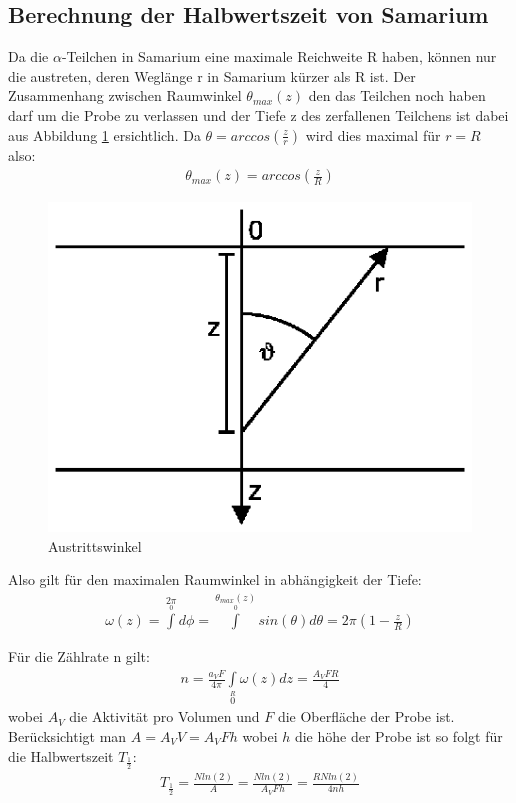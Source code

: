 \documentclass[12pt]{article}
\begin{document}
\subsection{Berechnung der Halbwertszeit von Samarium}
Da die $\alpha$-Teilchen in Samarium eine maximale Reichweite R haben, können nur die austreten, deren Weglänge r in Samarium kürzer als R ist. Der Zusammenhang zwischen Raumwinkel $\theta_{max}(z)$ den das Teilchen noch haben darf um die Probe zu verlassen und der Tiefe z des zerfallenen Teilchens ist dabei aus Abbildung \ref{winkel} ersichtlich.
Da $\theta = arccos(\frac{z}{r})$ wird dies maximal für $r=R$ also:
\begin{align}
 \theta_{max}(z) = arccos\left( \frac{z}{R} \right)
\end{align}

\begin{figure}[H]  
\centering
\label{winkel} \includegraphics[width=0.5\linewidth]{pictures/winkel.ps}
\caption{Austrittswinkel}
\end{figure}

Also gilt für den maximalen Raumwinkel in abhängigkeit der Tiefe:
\begin{align}
 \omega(z)= \int \limits^{2\pi} \limits_{0} d\phi = \int \limits^{\theta_{max}(z)} \limits_{0} sin(\theta)d\theta = 2\pi \left( 1 - \frac{z}{R} \right) 
\end{align}

Für die Zählrate n gilt:
\begin{align}
 n = \frac{a_V F}{4 \pi} \int \limits_0 \limits^R \omega (z) dz = \frac{A_V F R }{4}
\end{align}
wobei $A_V$ die Aktivität pro Volumen und $F$ die Oberfläche der Probe ist. Berücksichtigt man $A=A_V V = A_V F h$ wobei $h$ die höhe der Probe ist so folgt für die Halbwertszeit $T_{\frac{1}{2}}$:
\begin{align}
 T_{\frac{1}{2}} = \frac{N ln(2)}{A} = \frac{N ln(2)}{A_V F h} = \frac{R N ln(2)}{4 n h}
\end{align}
\end{document}
